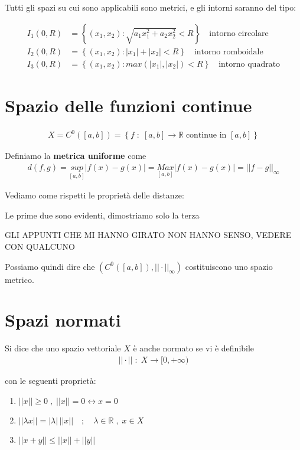 Tutti gli spazi su cui sono applicabili sono metrici, e gli intorni saranno del tipo:

\begin{align}
I_1(0,R) {}&= \left\{ (x_1,x_2) : \sqrt{a_1 x_1^2 + a_2 x_2^2} < R \right\} \quad \text{intorno circolare}\\
I_2(0,R) &= \left\{ (x_1,x_2) : |x_1| + |x_2|  < R
\right\} \quad \text{intorno romboidale} \\
I_3(0,R)&= \left\{ (x_1,x_2) : max(|x_1| , |x_2|)  < R
\right\}  \quad \text{intorno quadrato}
\end{align}

\newpage

\section{Spazio delle funzioni continue}

\begin{align}
X= C^0([a,b])= \left\{ f \; : \; [a,b] \rightarrow \mathbb{R} \; \text{continue in } [a,b]
\right\}
\end{align}

Definiamo la \textbf{metrica uniforme} come
\begin{align}
d(f,g) = \underset{[a,b]}{sup}|f(x) - g(x)| = \underset{[a,b]}{Max}|f(x) - g(x)|= ||f-g||_\infty
\end{align}

Vediamo come rispetti le proprietà delle distanze:

Le prime due sono evidenti, dimostriamo solo la terza

GLI APPUNTI CHE MI HANNO GIRATO NON HANNO SENSO, VEDERE CON QUALCUNO

\bigskip

Possiamo quindi dire che $(C^0([a,b]), ||\cdot||_\infty)$ costituiscono uno spazio metrico.

\section{Spazi normati}

Si dice che uno spazio vettoriale $X$ è anche normato se vi è definibile
\begin{align}
||\cdot|| \; : \; X \rightarrow [0, +\infty)
\end{align}

con le seguenti proprietà:

\begin{enumerate}
	\item $||x|| \geq 0 \; , \; ||x||=0 \leftrightarrow x=0$
	\item $||\lambda x||= |\lambda| \, ||x|| \quad ; \quad \lambda \in \mathbb{R} \; , \; x \in X$
	\item $||x+y|| \leq ||x|| + ||y||$
\end{enumerate}

